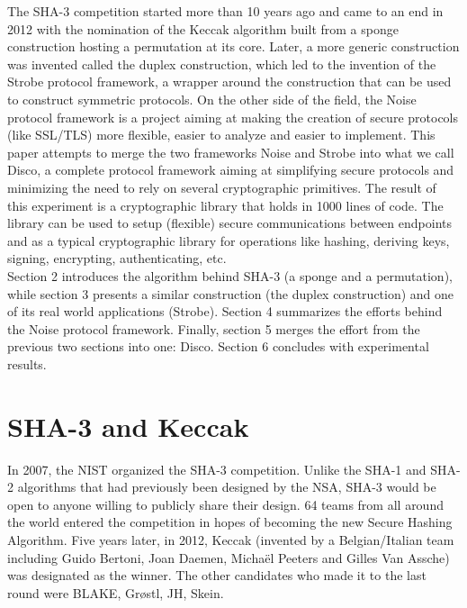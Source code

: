 \documentclass{article}
\begin{document}
The SHA-3 competition\cite{sha3} started more than 10 years ago and came to an end in 2012 with the nomination of the Keccak\cite{fips202} algorithm built from a sponge construction hosting a permutation at its core. Later, a more generic construction was invented called the duplex construction\cite{duplex}, which led to the invention of the Strobe protocol framework\cite{strobe}, a wrapper around the construction that can be used to construct symmetric protocols. On the other side of the field, the Noise protocol framework\cite{noise} is a project aiming at making the creation of secure protocols (like SSL/TLS) more flexible, easier to analyze and easier to implement. This paper attempts to merge the two frameworks Noise and Strobe into what we call Disco, a complete protocol framework aiming at simplifying secure protocols and minimizing the need to rely on several cryptographic primitives. The result of this experiment is a cryptographic library that holds in 1000 lines of code. The library can be used to setup (flexible) secure communications between endpoints and as a typical cryptographic library for operations like hashing, deriving keys, signing, encrypting, authenticating, etc.\\

Section 2 introduces the algorithm behind SHA-3 (a sponge and a permutation), while section 3 presents a similar construction (the duplex construction) and one of its real world applications (Strobe). Section 4 summarizes the efforts behind the Noise protocol framework. Finally, section 5 merges the effort from the previous two sections into one: Disco. Section 6 concludes with experimental results.

\section{SHA-3 and Keccak}

In 2007, the NIST organized the SHA-3 competition\cite{sha3}. Unlike the SHA-1 and SHA-2 algorithms that had previously been designed by the NSA, SHA-3 would be open to anyone willing to publicly share their design. 64 teams from all around the world entered the competition in hopes of becoming the new Secure Hashing Algorithm. Five years later, in 2012, Keccak (invented by a Belgian/Italian team including Guido Bertoni, Joan Daemen, Michaël Peeters and Gilles Van Assche) was designated as the winner\cite{fips202}. The other candidates who made it to the last round were BLAKE, Grøstl, JH, Skein.\\
\end{document}
